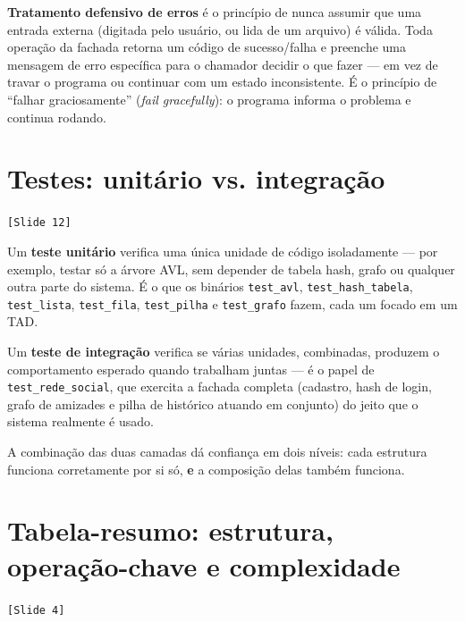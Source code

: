 \documentclass[11pt,a4paper]{article}
\newcommand{\slideref}[1]{\textcolor{accentwarm}{\texttt{[Slide #1]}}}
\newcommand{\code}[1]{\texttt{#1}}
\begin{document}
\textbf{Tratamento defensivo de erros} é o princípio de nunca assumir que
uma entrada externa (digitada pelo usuário, ou lida de um arquivo) é
válida. Toda operação da fachada retorna um código de sucesso/falha e
preenche uma mensagem de erro específica para o chamador decidir o que
fazer --- em vez de travar o programa ou continuar com um estado
inconsistente. É o princípio de ``falhar graciosamente'' (\emph{fail
gracefully}): o programa informa o problema e continua rodando.

\section{Testes: unitário vs. integração}
\slideref{12}

Um \textbf{teste unitário} verifica uma única unidade de código
isoladamente --- por exemplo, testar só a árvore AVL, sem depender de
tabela hash, grafo ou qualquer outra parte do sistema. É o que os binários
\code{test\_avl}, \code{test\_hash\_tabela}, \code{test\_lista},
\code{test\_fila}, \code{test\_pilha} e \code{test\_grafo} fazem, cada um
focado em um TAD.

Um \textbf{teste de integração} verifica se várias unidades, combinadas,
produzem o comportamento esperado quando trabalham juntas --- é o papel de
\code{test\_rede\_social}, que exercita a fachada completa (cadastro, hash
de login, grafo de amizades e pilha de histórico atuando em conjunto) do
jeito que o sistema realmente é usado.

A combinação das duas camadas dá confiança em dois níveis: cada estrutura
funciona corretamente por si só, \textbf{e} a composição delas também
funciona.

\section{Tabela-resumo: estrutura, operação-chave e complexidade}
\slideref{4}
\end{document}
